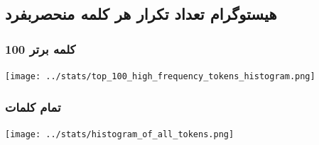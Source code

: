 {		%
			
		\newpage
		\subsection{هیستوگرام تعداد تکرار هر کلمه منحصربفرد}
		{
			\subsubsection{100 کلمه برتر}
			{
				\begin{center}
					\texttt{[image: ../stats/top\_100\_high\_frequency\_tokens\_histogram.png]}
				\end{center}
			}
			\subsubsection{تمام کلمات}
			{
				\begin{center}
					\texttt{[image: ../stats/histogram\_of\_all\_tokens.png]}
				\end{center}
			}
		}
	}